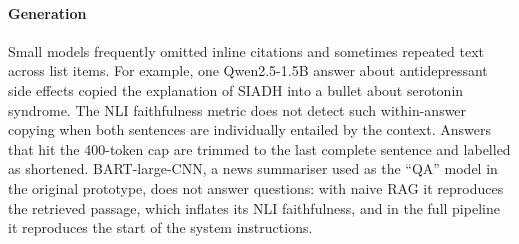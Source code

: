 \documentclass[preprint,12pt,authoryear]{elsarticle}
\begin{document}
\paragraph{Generation} Small models frequently omitted inline citations and sometimes repeated text across list
items. For example, one Qwen2.5-1.5B answer about antidepressant side effects copied the explanation of SIADH into a bullet
about serotonin syndrome. The NLI faithfulness metric does not detect such within-answer copying when both sentences are
individually entailed by the context. Answers that hit the 400-token cap are trimmed to the last complete sentence and
labelled as shortened. BART-large-CNN, a news summariser used as the ``QA'' model in the original prototype, does not
answer questions: with naive RAG it reproduces the retrieved passage, which inflates its NLI faithfulness, and in the full
pipeline it reproduces the start of the system instructions.

\end{document}
